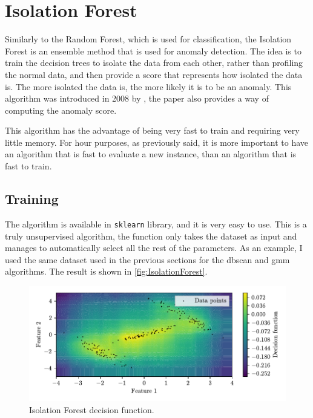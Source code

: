 \section{Isolation Forest}
\label{sec:IsolationForest}

Similarly to the Random Forest, which is used for classification, the Isolation Forest is an ensemble method that is used for anomaly detection. The idea is to train the decision trees to isolate the data from each other, rather than profiling the normal data, and then provide a score that represents how isolated the data is. The more isolated the data is, the more likely it is to be an anomaly. This algorithm was introduced in 2008 by \cite{iforest}, the paper also provides a way of computing the anomaly score.

This algorithm has the advantage of being very fast to train and requiring very little memory. For hour purposes, as previously said, it is more important to have an algorithm that is fast to evaluate a new instance, than an algorithm that is fast to train.

\subsection{Training}
The algorithm is available in \texttt{sklearn} library, and it is very easy to use. This is a truly unsupervised algorithm, the function only takes the dataset as input and manages to automatically select all the rest of the parameters. As an example, I used the same dataset used in the previous sections for the \gls{dbscan} and {\gls{gmm}} algorithms. The result is shown in \autoref{fig:IsolationForest}.

\begin{figure}
    \centering
    \includegraphics{images/IForest/Figure_1.pdf}
    \caption{Isolation Forest decision function.}
    \label{fig:IsolationForest}
\end{figure}

